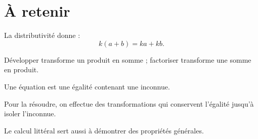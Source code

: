 \section{À retenir}

\begin{aretenir}
La distributivité donne :
\[
\boxed{k(a+b)=ka+kb}.
\]

Développer transforme un produit en somme ; factoriser transforme une somme en produit.

Une équation est une égalité contenant une inconnue.

Pour la résoudre, on effectue des transformations qui conservent l'égalité jusqu'à isoler l'inconnue.

Le calcul littéral sert aussi à démontrer des propriétés générales.
\end{aretenir}
